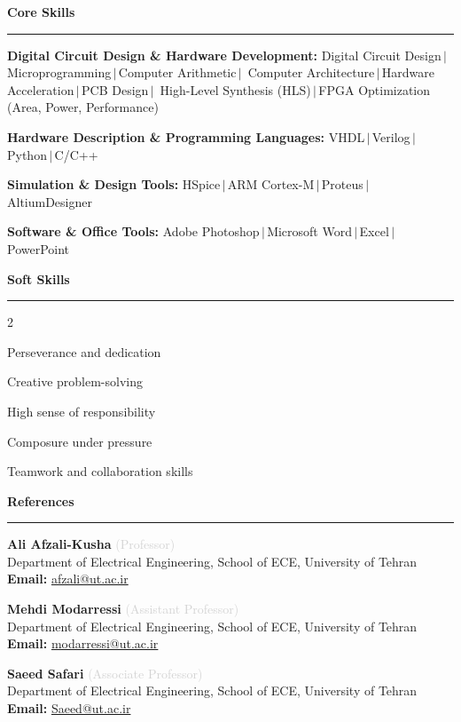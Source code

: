 \documentclass[11pt,a4paper]{article}
\newcommand{\cvsection}[2]{%
  \vspace{0.35cm}%
  \noindent\textcolor{sectiongray}{%
    {\fontsize{11.5pt}{14pt}\selectfont\textbf{#1}}%
    \hspace{0.45em}%
    \textcolor{sectiongray!50}{\rule[0.55ex]{#2\linewidth}{0.45pt}}%
  }%
  \vspace{0.18cm}%
}
\newcommand{\refentry}[4]{%
  \item \textbf{#1} \textcolor{lightgray}{(#2)}\\
        #3, University of Tehran\\
        \textbf{Email:} \href{mailto:#4}{#4}%
}
\newcommand{\sep}{\,$|$\,}
\begin{document}
\cvsection{Core Skills}{0.873}

\footnotesize
\begin{cvlist}
  \item \textbf{Digital Circuit Design \& Hardware Development:}
        Digital Circuit Design\sep Microprogramming\sep Computer Arithmetic\sep
        Computer Architecture\sep Hardware Acceleration\sep PCB Design\sep
        High-Level Synthesis (HLS)\sep FPGA Optimization (Area, Power, Performance)

  \item \textbf{Hardware Description \& Programming Languages:}
        VHDL\sep Verilog\sep Python\sep C/C++

  \item \textbf{Simulation \& Design Tools:}
        HSpice\sep ARM Cortex-M\sep Proteus\sep AltiumDesigner

  \item \textbf{Software \& Office Tools:}
        Adobe Photoshop\sep Microsoft Word\sep Excel\sep PowerPoint
\end{cvlist}

\cvsection{Soft Skills}{0.882}

\footnotesize
\begin{multicols}{2}
  \begin{cvlist}
    \item Perseverance and dedication
    \item Creative problem-solving
    \item High sense of responsibility
    \columnbreak
    \item Composure under pressure
    \item Teamwork and collaboration skills
  \end{cvlist}
\end{multicols}

\cvsection{References}{0.875}

\footnotesize
\begin{cvlist}
  \refentry{Ali Afzali-Kusha}{Professor}%
           {Department of Electrical Engineering, School of ECE}{afzali@ut.ac.ir}

  \refentry{Mehdi Modarressi}{Assistant Professor}%
           {Department of Electrical Engineering, School of ECE}{modarressi@ut.ac.ir}

  \refentry{Saeed Safari}{Associate Professor}%
           {Department of Electrical Engineering, School of ECE}{Saeed@ut.ac.ir}
\end{cvlist}
\end{document}
